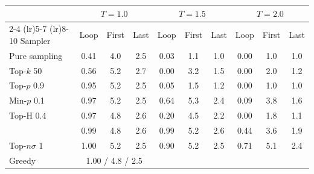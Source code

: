 \begin{tabular}{lccccccccc}
\toprule
 & \multicolumn{3}{c}{$T{=}1.0$} & \multicolumn{3}{c}{$T{=}1.5$} & \multicolumn{3}{c}{$T{=}2.0$} \\
\cmidrule(lr){2-4} \cmidrule(lr){5-7} \cmidrule(lr){8-10}
Sampler & Loop & First & Last & Loop & First & Last & Loop & First & Last \\
\midrule
Pure sampling & 0.41 & 4.0 & 2.5 & 0.03 & 1.1 & 1.0 & 0.00 & 1.0 & 1.0 \\
Top-$k$ 50 & 0.56 & 5.2 & 2.7 & 0.00 & 3.2 & 1.5 & 0.00 & 2.0 & 1.2 \\
Top-$p$ 0.9 & 0.95 & 5.2 & 2.5 & 0.05 & 1.5 & 1.2 & 0.00 & 1.0 & 1.0 \\
Min-$p$ 0.1 & 0.97 & 5.2 & 2.5 & 0.64 & 5.3 & 2.4 & 0.09 & 3.8 & 1.6 \\
Top-H 0.4 & 0.97 & 4.8 & 2.6 & 0.20 & 4.5 & 2.2 & 0.00 & 1.8 & 1.1 \\
\pless{} & 0.99 & 4.8 & 2.6 & 0.99 & 5.2 & 2.6 & 0.44 & 3.6 & 1.9 \\
Top-$n\sigma$ 1 & 1.00 & 5.2 & 2.5 & 0.90 & 5.2 & 2.5 & 0.71 & 5.1 & 2.4 \\
\midrule
Greedy & \multicolumn{3}{c}{1.00 / 4.8 / 2.5} &  &  &  &  &  &  \\
\bottomrule
\end{tabular}
